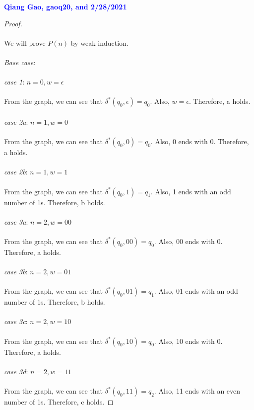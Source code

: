 \documentclass[11pt,fleqn]{article}
\begin{document}
   \textcolor{blue}{\textbf{Qiang Gao, gaoq20, and 2/28/2021}}\\
   \begin{proof}
    \\\\
    We will prove $P(n)$ by weak induction.
    \\\\
    \medskip
    \emph{Base case}: 
    \\\\
    \emph{case 1}: $n = 0, w = \epsilon$
    \\\\
    From the graph, we can see that $\delta^*(q_0,\epsilon) = q_0$. Also, $w = \epsilon$. Therefore, a holds.
    \\\\
    \emph{case 2a}: $n = 1, w = 0$
    \\\\
    From the graph, we can see that $\delta^*(q_0,0) = q_0$. Also, 0 ends with 0. Therefore, a holds.
    \\\\
    \emph{case 2b}: $n = 1, w = 1$
    \\\\
    From the graph, we can see that $\delta^*(q_0,1) = q_1$. Also, 1 ends with an odd number of 1s. Therefore, b holds.
    \\\\
    \emph{case 3a}: $n = 2, w = 00$
    \\\\
    From the graph, we can see that $\delta^*(q_0,00) = q_0$. Also, 00 ends with 0. Therefore, a holds.
    \\\\
    \emph{case 3b}: $n = 2, w = 01$
    \\\\
    From the graph, we can see that $\delta^*(q_0,01) = q_1$. Also, 01 ends with an odd number of 1s. Therefore, b holds.
    \\\\
    \emph{case 3c}: $n = 2, w = 10$
    \\\\
    From the graph, we can see that $\delta^*(q_0,10) = q_0$. Also, 10 ends with 0. Therefore, a holds.
    \\\\
    \emph{case 3d}: $n = 2, w = 11$
    \\\\
    From the graph, we can see that $\delta^*(q_0,11) = q_2$. Also, 11 ends with an even number of 1s. Therefore, c holds.

\end{proof}
\end{document}
